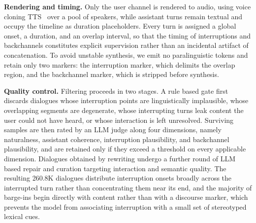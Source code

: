 

\textbf{Rendering and timing.} Only the user channel is rendered to audio, using voice cloning TTS~\cite{cosyvoice3,hu2026qwen3} over a pool of speakers, while assistant turns remain textual and occupy the timeline as duration placeholders. Every turn is assigned a global onset, a duration, and an overlap interval, so that the timing of interruptions and backchannels constitutes explicit supervision rather than an incidental artifact of concatenation. To avoid unstable synthesis, we emit no paralinguistic tokens and retain only two markers: the interruption marker, which delimits the overlap region, and the backchannel marker, which is stripped before synthesis.

\textbf{Quality control.} Filtering proceeds in two stages. A rule based gate first discards dialogues whose interruption points are linguistically implausible, whose overlapping segments are degenerate, whose interrupting turns leak content the user could not have heard, or whose interaction is left unresolved. Surviving samples are then rated by an LLM judge along four dimensions, namely naturalness, assistant coherence, interruption plausibility, and backchannel plausibility, and are retained only if they exceed a threshold on every applicable dimension. Dialogues obtained by rewriting undergo a further round of LLM based repair and curation targeting interaction and semantic quality. The resulting 260.8K dialogues distribute interruption onsets broadly across the interrupted turn rather than concentrating them near its end, and the majority of barge-ins begin directly with content rather than with a discourse marker, which prevents the model from associating interruption with a small set of stereotyped lexical cues.





